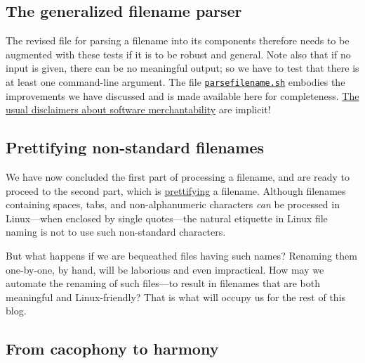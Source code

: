 \documentclass[
  a4paper,
]{article}
\begin{document}
\hypertarget{the-generalized-filename-parser}{%
\subsection{The generalized filename
parser}\label{the-generalized-filename-parser}}

The revised file for parsing a filename into its components therefore
needs to be augmented with these tests if it is to be robust and
general. Note also that if no input is given, there can be no meaningful
output; so we have to test that there is at least one command-line
argument. The file
\href{scripts/parsefilename.sh}{\texttt{parsefilename.sh}} embodies the
improvements we have discussed and is made available here for
completeness. \href{https://core.ac.uk/download/pdf/267973227.pdf}{The
usual disclaimers about software merchantability} are implicit!
 \normalfont

\hypertarget{prettifying-non-standard-filenames}{%
\subsection{Prettifying non-standard
filenames}\label{prettifying-non-standard-filenames}}

We have now concluded the first part of processing a filename, and are
ready to proceed to the second part, which is
\href{https://www.thefreedictionary.com/prettifying}{prettifying} a
filename. Although filenames containing spaces, tabs, and
non-alphanumeric characters \emph{can} be processed in Linux---when
enclosed by single quotes---the natural etiquette in Linux file naming
is not to use such non-standard characters.

But what happens if we are bequeathed files having such names? Renaming
them one-by-one, by hand, will be laborious and even impractical. How
may we automate the renaming of such files---to result in filenames that
are both meaningful and Linux-friendly? That is what will occupy us for
the rest of this blog.

\hypertarget{from-cacophony-to-harmony}{%
\subsection{From cacophony to harmony}\label{from-cacophony-to-harmony}}
\end{document}
